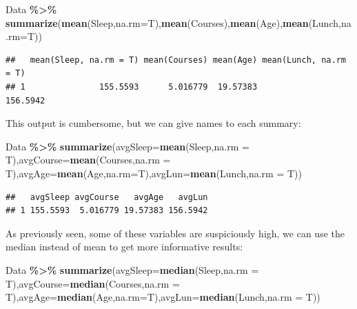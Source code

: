 \documentclass[
  openany]{book}
\newenvironment{Shaded}{\begin{snugshade}}{\end{snugshade}}
\newcommand{\AttributeTok}[1]{\textcolor[rgb]{0.13,0.29,0.53}{#1}}
\newcommand{\FunctionTok}[1]{\textcolor[rgb]{0.13,0.29,0.53}{\textbf{#1}}}
\newcommand{\NormalTok}[1]{#1}
\newcommand{\SpecialCharTok}[1]{\textcolor[rgb]{0.81,0.36,0.00}{\textbf{#1}}}
\begin{document}
\begin{Shaded}
\begin{Highlighting}[]
\NormalTok{Data }\SpecialCharTok{\%\textgreater{}\%} 
  \FunctionTok{summarize}\NormalTok{(}\FunctionTok{mean}\NormalTok{(Sleep,}\AttributeTok{na.rm=}\NormalTok{T),}\FunctionTok{mean}\NormalTok{(Courses),}\FunctionTok{mean}\NormalTok{(Age),}\FunctionTok{mean}\NormalTok{(Lunch,}\AttributeTok{na.rm=}\NormalTok{T))}
\end{Highlighting}
\end{Shaded}

\begin{verbatim}
##   mean(Sleep, na.rm = T) mean(Courses) mean(Age) mean(Lunch, na.rm = T)
## 1               155.5593      5.016779  19.57383               156.5942
\end{verbatim}

This output is cumbersome, but we can give names to each summary:

\begin{Shaded}
\begin{Highlighting}[]
\NormalTok{Data }\SpecialCharTok{\%\textgreater{}\%} 
  \FunctionTok{summarize}\NormalTok{(}\AttributeTok{avgSleep=}\FunctionTok{mean}\NormalTok{(Sleep,}\AttributeTok{na.rm =}\NormalTok{ T),}\AttributeTok{avgCourse=}\FunctionTok{mean}\NormalTok{(Courses,}\AttributeTok{na.rm =}\NormalTok{ T),}\AttributeTok{avgAge=}\FunctionTok{mean}\NormalTok{(Age,}\AttributeTok{na.rm=}\NormalTok{T),}\AttributeTok{avgLun=}\FunctionTok{mean}\NormalTok{(Lunch,}\AttributeTok{na.rm =}\NormalTok{ T))}
\end{Highlighting}
\end{Shaded}

\begin{verbatim}
##   avgSleep avgCourse   avgAge   avgLun
## 1 155.5593  5.016779 19.57383 156.5942
\end{verbatim}

As previously seen, some of these variables are suspiciously high, we can use the median instead of mean to get more informative results:

\begin{Shaded}
\begin{Highlighting}[]
\NormalTok{Data }\SpecialCharTok{\%\textgreater{}\%} 
  \FunctionTok{summarize}\NormalTok{(}\AttributeTok{avgSleep=}\FunctionTok{median}\NormalTok{(Sleep,}\AttributeTok{na.rm =}\NormalTok{ T),}\AttributeTok{avgCourse=}\FunctionTok{median}\NormalTok{(Courses,}\AttributeTok{na.rm =}\NormalTok{ T),}\AttributeTok{avgAge=}\FunctionTok{median}\NormalTok{(Age,}\AttributeTok{na.rm=}\NormalTok{T),}\AttributeTok{avgLun=}\FunctionTok{median}\NormalTok{(Lunch,}\AttributeTok{na.rm =}\NormalTok{ T))}
\end{Highlighting}
\end{Shaded}
\end{document}
